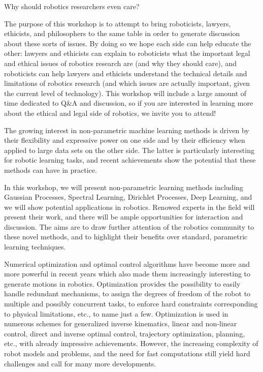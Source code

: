 \begin{spacing}{1.0}
{Why should robotics researchers even care?

The purpose of this workshop is to attempt to bring roboticists, lawyers, ethicists, and philosophers to the same table in order to generate discussion about these sorts of issues. By doing so we hope each side can help educate the other: lawyers and ethicists can explain to roboticists what the important legal and ethical issues of robotics research are (and why they should care), and roboticists can help lawyers and ethicists understand the technical details and limitations of robotics research (and which issues are actually important, given the current level of technology). This workshop will include a large amount of time dedicated to Q\&A and discussion, so if you are interested in learning more about the ethical and legal side of robotics, we invite you to attend!
}


{
The growing interest in non-parametric machine learning methods is driven by their flexibility and expressive power on one side and by their efficiency when applied to large data sets on the other side. The latter is particularly interesting for robotic learning tasks, and recent achievements show the potential that these methods can have in practice. 

In this workshop, we will present non-parametric learning methods including Gaussian Processes, Spectral Learning, Dirichlet Processes, Deep Learning, and we will show potential applications in robotics. 
Renowed experts in the field will present their work, and there will be ample opportunities for interaction and discussion. The aims are to draw further attention of the robotics community to these novel methods, and to highlight their benefits over standard, parametric learning techniques.
}


{
Numerical optimization and optimal control algorithms have become more and more powerful in recent years which also made them increasingly interesting to generate motions in robotics.  Optimization provides the possibility to easily handle redundant mechanisms, to assign the degrees of freedom of the robot to multiple and possibly concurrent tasks, to enforce hard constraints corresponding to physical limitations, etc., to name just a few.  Optimization is used in numerous schemes for generalized inverse kinematics, linear and non-linear control, direct and inverse optimal control, trajectory optimization, planning, etc., with already impressive achievements. However, the increasing complexity of robot models and problems, and the need for fast computations still yield hard challenges and call for many more developments.

}
\end{spacing}
